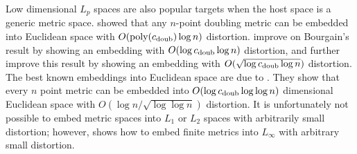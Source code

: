 \documentclass[thesis.tex]{subfiles}
\newcommand{\dist}[2]{\distf({#1},{#2})}
\newcommand{\distf}{d}
\newcommand{\doubdim}{\text{dim}_\textnormal{doub}}
\newcommand{\cdoub}{c_\textnormal{doub}}
\newcommand{\poly}[1]{\text{poly}(#1)}
\begin{document}
Low dimensional $L_p$ spaces are also popular targets when the host space is a generic metric space.
\cite{bourgain1985lipschitz} showed that any $n$-point doubling metric can be embedded into Euclidean space with $O(\poly{\cdoub}\log n)$ distortion.
\cite{gupta2003bounded} improve on Bourgain's result by showing an embedding with $O(\log\cdoub\log n)$ distortion,
and \cite{krauthgamer2004measured} further improve this result by showing an embedding with $O(\sqrt{\log\cdoub\log n})$ distortion.
The best known embeddings into Euclidean space are due to \cite{chan2010ultra}.
They show that every $n$ point metric can be embedded into $O(\log\cdoub\log\log n)$ dimensional Euclidean space with $O(\log n/\sqrt{\log\log n})$ distortion.
It is unfortunately not possible to embed metric spaces into $L_1$ or $L_2$ spaces with arbitrarily small distortion;
however, \cite{neiman2016low} shows how to embed finite metrics into $L_\infty$ with arbitrary small distortion.

\end{document}
